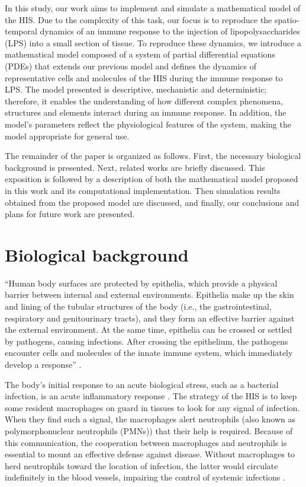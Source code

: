 \documentclass[10pt]{bmc_article}
\newenvironment{bmcformat}{\baselineskip20pt\sloppy\setboolean{publ}{false}}{\baselineskip20pt\sloppy}
\begin{document}
\begin{bmcformat}
In this study, our work aims to implement and simulate a mathematical model of the HIS. Due to the complexity of this task, our 
focus is to reproduce the spatio-temporal dynamics of an immune response to the injection of lipopolysaccharides (LPS) into a small 
section of tissue. To reproduce these dynamics, we introduce a mathematical model composed of a system of partial differential 
equations (PDEs) that extends our previous model\cite{icaris11} and defines the dynamics of representative cells and molecules of the 
HIS during the immune response to LPS. The model presented is descriptive, mechanistic and deterministic; therefore, it enables 
the understanding of how different complex phenomena, structures and elements interact during an immune response. In addition, the 
model's parameters reflect the physiological features of the system, making the model appropriate for general use.

The remainder of the paper is organized as follows. First, the necessary biological background is presented. Next, related works are 
briefly discussed. This exposition is followed by a description of both the mathematical model proposed in this work and its 
computational implementation. Then simulation results obtained from the proposed model are discussed, and finally, our conclusions 
and plans for future work are presented.

\section*{Biological background}\label{background}

``Human body surfaces are protected by epithelia, which provide a physical barrier between internal and external environments. 
Epithelia make up the skin and lining of the tubular structures of the body (i.e., the gastrointestinal, respiratory and genitourinary 
tracts), and they form an effective barrier against the external environment. At the same time, epithelia can be crossed or settled by 
pathogens, causing infections. After crossing the epithelium, the pathogens encounter cells and molecules of the innate immune system, 
which immediately develop a response'' \cite{janeway}.

The body's initial response to an acute biological stress, such as a bacterial infection, is an acute inflammatory 
response \cite{janeway}. The strategy of the HIS is to keep some resident macrophages on guard in tissues to look for any signal of 
infection. When they find such a signal, the macrophages alert neutrophils (also known as polymorphonuclear neutrophils (PMNs)) 
that their help is required. Because of this communication, the cooperation between macrophages and neutrophils is essential to 
mount an effective defense against disease. Without macrophages to herd neutrophils toward the location of infection, the latter 
would circulate indefinitely in the blood vessels, impairing the control of systemic infections \cite{Sompayrac2008}.


\end{bmcformat}
\end{document}
